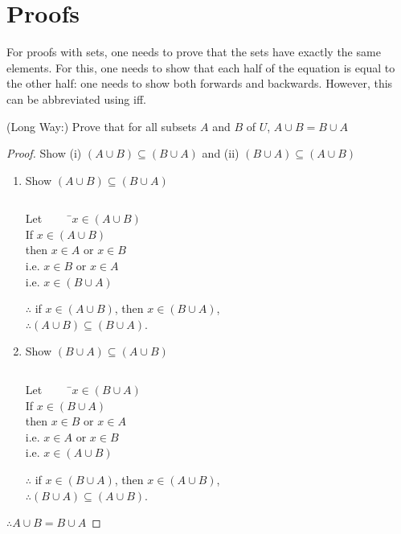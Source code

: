 \documentclass[../notes.tex]{subfiles}
\begin{document}
		\section{Proofs}
			For proofs with sets, one needs to prove that the sets have exactly the same elements. For this, one needs to show that each half of the equation is equal to the other half: one needs to show both forwards and backwards. However, this can be abbreviated using iff.
			\begin{example}
				(Long Way:) Prove that for all subsets $A$ and $B$ of $U$, $A \cup B = B \cup A$
				\begin{proof}
					Show (i) $(A \cup B) \subseteq (B \cup A)$ and (ii) $(B \cup A) \subseteq (A \cup B)$
					\begin{enumerate}[label=(\roman*)]
						\item Show $(A \cup B) \subseteq (B \cup A)$
							\begin{subproof}[Subproof]
								\removelastskip $ $
								\begin{tabbing}
									Let $\qquad$ \=$x \in (A \cup B)$\\
									If \>$x \in (A \cup B)$\\
									then \> $x \in A$ or $x \in B$\\
									i.e. \> $x \in B$ or $x \in A$\\
									i.e. \> $x \in (B \cup A)$
								\end{tabbing}
								$\therefore$ if $x \in (A \cup B)$, then $x \in (B \cup A)$,\\
								$\therefore (A \cup B) \subseteq (B \cup A)$.
							\end{subproof}
						\item Show $(B \cup A) \subseteq (A \cup B)$
							\begin{subproof}[Subproof]
								\removelastskip $ $
								\begin{tabbing}
									Let $\qquad$ \=$x \in (B \cup A)$\\
									If \>$x \in (B \cup A)$\\
									then \> $x \in B$ or $x \in A$\\
									i.e. \> $x \in A$ or $x \in B$\\
									i.e. \> $x \in (A \cup B)$
								\end{tabbing}
								$\therefore$ if $x \in (B \cup A)$, then $x \in (A \cup B)$,\\
								$\therefore (B \cup A) \subseteq (A \cup B)$.
							\end{subproof}
					\end{enumerate}
					$\therefore A \cup B = B \cup A$
				\end{proof}
			\end{example}
\end{document}
